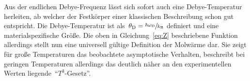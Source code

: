 %
Aus der endlichen Debye-Frequenz lässt sich sofort auch eine Debye-Temperatur
herleiten, ab welcher der Festkörper einer klassischen Beschreibung schon gut
entspricht. Die Debye-Temperatur ist
als~$\theta_{\mathrm{D}}=\sfrac{\hbar\omega_{\mathrm{D}}}{k_{\mathrm{B}}}$
definiert und eine materialspezifische Größe. Die oben in Gleichung~\eqref{eq:Z}
beschriebene Funktion allerdings stellt nun eine universell gültige Definition
der Molwärme dar. Sie zeigt für große Temperaturen das beobachtete asymptotische
Verhalten, beschreibt bei geringen Temperaturen allerdings das deutlich näher an
den experimentellen Werten liegende~\enquote{$T^3$-Gesetz}.
